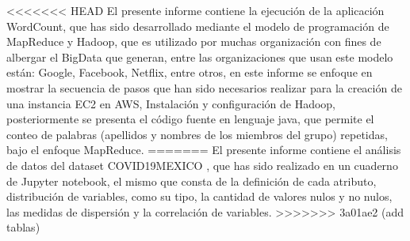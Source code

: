 \documentclass[
	spanish, %
	a4paper, oneside
]{article}
\begin{document}
	
\templatePortrait

\templatePagecfg

\begin{abstractd}
<<<<<<< HEAD
El presente informe contiene la ejecución de la aplicación WordCount, que has sido desarrollado mediante el modelo de programación de MapReduce y Hadoop, que es utilizado por muchas organización con fines de albergar el BigData que generan, entre las organizaciones que usan este modelo están: Google, Facebook, Netflix, entre otros, en este informe se enfoque en mostrar la secuencia de pasos que han sido necesarios realizar para la creación de una instancia EC2 en AWS, Instalación y configuración de Hadoop, posteriormente se presenta el código fuente en lenguaje java, que permite el conteo de palabras (apellidos y nombres de los miembros del grupo) repetidas, bajo el enfoque MapReduce.
=======
El presente informe contiene el análisis de datos del dataset COVID19MEXICO \cite{Salud} , que has sido realizado en un cuaderno de Jupyter notebook, el mismo que consta de la definición de cada atributo, distribución de variables, como su tipo, la cantidad de valores nulos  y no nulos, las medidas de dispersión y la correlación de variables.  
>>>>>>> 3a01ae2 (add tablas)
\end{abstractd}

\templateIndex

\templateFinalcfg



\end{document}

